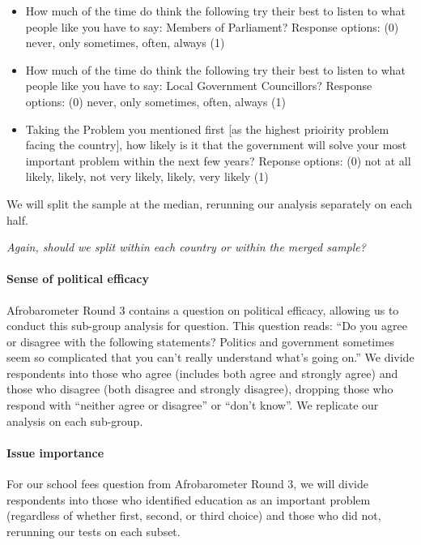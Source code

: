 \documentclass[]{article}
\let\oldparagraph\paragraph
\renewcommand{\paragraph}[1]{\oldparagraph{#1}\mbox{}}
\begin{document}
\begin{itemize}
  \item How much of the time do think the following try their best to listen to what people like you have to say: Members of Parliament? Response options: (0) never, only sometimes, often, always (1)
  \item How much of the time do think the following try their best to listen to what people like you have to say: Local Government Councillors? Response options: (0) never, only sometimes, often, always (1)
  \item Taking the Problem you mentioned first [as the highest prioirity problem facing the country], how likely is it that the government will solve your most important problem within the next few years? Reponse options: (0) not at all likely, likely, not very likely, likely, very likely (1)
\end{itemize}

We will split the sample at the median, rerunning our analysis
separately on each half.

\textit{Again, should we split within each country or within the merged sample?}

\paragraph{Sense of political
efficacy}\label{sense-of-political-efficacy}

Afrobarometer Round 3 contains a question on political efficacy,
allowing us to conduct this sub-group analysis for question. This
question reads: ``Do you agree or disagree with the following
statements? Politics and government sometimes seem so complicated that
you can't really understand what's going on.'' We divide respondents
into those who agree (includes both agree and strongly agree) and those
who disagree (both disagree and strongly disagree), dropping those who
respond with ``neither agree or disagree'' or ``don't know''. We
replicate our analysis on each sub-group.

\paragraph{Issue importance}\label{issue-importance}

For our school fees question from Afrobarometer Round 3, we will divide
respondents into those who identified education as an important problem
(regardless of whether first, second, or third choice) and those who did
not, rerunning our tests on each subset.
\end{document}
